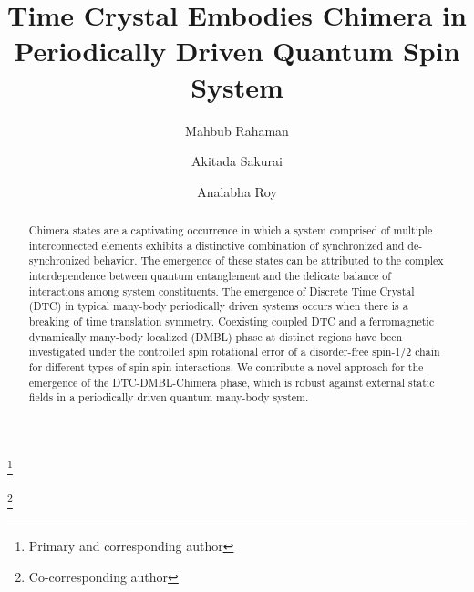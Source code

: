 \documentclass[
nofootinbib,
reprint,
superscriptaddress,
amsmath,amssymb,showkeys,
aps,
prb,
]{revtex4-2}
\begin{document}
	
	\title{Time Crystal Embodies Chimera in Periodically Driven Quantum Spin System}
	
	\author{Mahbub Rahaman}
	\thanks{Primary and corresponding author}
	\author{Akitada Sakurai}
	\author{Analabha Roy}
	\thanks{Co-corresponding author}
	
	\begin{abstract}
		Chimera states are a captivating occurrence in which a system comprised of multiple interconnected elements exhibits a distinctive combination of synchronized and de-synchronized behavior. The emergence of these states can be attributed to the complex interdependence between quantum entanglement and the delicate balance of interactions among system constituents. The emergence of Discrete Time Crystal (DTC) in typical many-body periodically driven systems occurs when there is a breaking of time translation symmetry. Coexisting coupled DTC and a ferromagnetic dynamically many-body localized (DMBL) phase at distinct regions have been investigated under the controlled spin rotational error of a disorder-free spin-1/2 chain for different types of spin-spin interactions. We contribute a novel approach for the emergence of the DTC-DMBL-Chimera phase, which is robust against external static fields in a periodically driven quantum many-body system.
	\end{abstract}
	
	\maketitle
	
	
\end{document}
